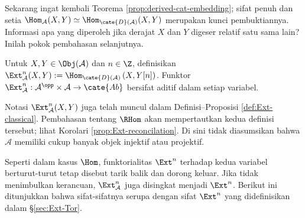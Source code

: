Sekarang ingat kembali Teorema \ref{prop:derived-cat-embedding}; sifat penuh dan
setia
$\Hom_{\mathcal{A}}(X, Y) \simeq \Hom_{\cate{D}(\mathcal{A})}(X, Y)$
	merupakan kunci pembuktiannya. Informasi apa yang diperoleh jika derajat $X$
	dan $Y$ digeser relatif satu sama lain? Inilah pokok pembahasan
selanjutnya.

\begin{definisi}\label{def:Ext-general}
	Untuk $X, Y \in \Obj(\mathcal{A})$ dan $n \in \Z$, definisikan
	$\Ext^n_{\mathcal{A}}(X, Y) :=
	\Hom_{\cate{D}(\mathcal{A})}\left(X, Y[n] \right)$. Funktor
	$\Ext^n_{\mathcal{A}}: \mathcal{A}^{\opp} \times \mathcal{A} \to
	\cate{Ab}$ bersifat aditif dalam setiap variabel.
\end{definisi}

Notasi $\Ext^n_{\mathcal{A}}(X, Y)$ juga telah muncul dalam
Definisi--Proposisi \ref{def:Ext-classical}. Pembahasan tentang $\RHom$ akan
mempertautkan kedua definisi tersebut; lihat Korolari
\ref{prop:Ext-reconcilation}. Di sini tidak diasumsikan bahwa $\mathcal{A}$
memiliki cukup banyak objek injektif atau projektif.

Seperti dalam kasus $\Hom$, funktorialitas $\Ext^n$ terhadap kedua variabel
berturut-turut tetap disebut tarik balik dan dorong keluar. Jika tidak
menimbulkan kerancuan, $\Ext^n_{\mathcal{A}}$ juga disingkat menjadi $\Ext^n$.
Berikut ini ditunjukkan bahwa sifat-sifatnya serupa dengan sifat $\Ext^n$ yang
didefinisikan dalam \S\ref{sec:Ext-Tor}.

